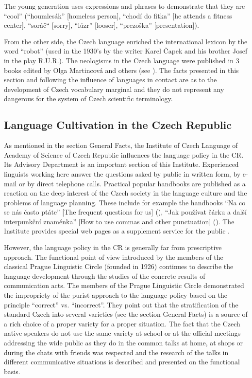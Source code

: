 \begin{multicols}{2}
The young generation uses expressions and phrases to demonstrate that they are “cool” (“houmlesák” {[}homeless person{]}, “chodí do fitka” {[}he attends a fitness center{]}, “soráč“ {[}sorry{]}, “lúzr” {[}looser{]}, “prezoška” {[}presentation{]}).

From the other side, the Czech language enriched the international lexicon by the word “robot” (used in the 1930’s by the writer Karel Čapek and his brother Josef in the play R.U.R.).
The neologisms in the Czech language were published in 3 books edited by Olga Martincová and others (see \cite{Martincova}).
The facts presented in this section and following the influence of languages in contact are as to the development of Czech vocabulary marginal and they do not represent any dangerous for the system of Czech scientific terminology.

\subsection{Language Cultivation in the Czech Republic}

As mentioned in the section General Facts, the Institute of Czech Language of Academy of Science of Czech Republic influences the language policy in the CR. Its Advisory Department is an important section of this Institute. Experienced linguists working here answer the questions asked by public in written form, by e-mail or by direct telephone calls. Practical popular handbooks are published as a reaction on the deep interest of the Czech society in the language culture and the problems of language planning. These include for example the handbooks “Na co se nás často ptáte” {[}The frequent questions for us{]} (\cite{Cerna}), “Jak používat čárku a další interpunkční znaménka” {[}How to use commas and other punctuation{]} (\cite{Janovec}). The Institute provides special web pages as a supplement service for the public \cite{Note6}.

However, the language policy in the CR is generally far from prescriptive approach. The functional point of view introduced by the members of the classical Prague Linguistic Circle (founded in 1926) continues to describe the language development through the studies of the concrete results of communication acts. The members of the Prague Linguistic Circle demonstrated the impropriety of the purist approach to the language policy based on the principle “correct” vs. “incorrect”.  They point out that the stratification of the standard Czech into several varieties (see the section General Facts) is a source of a rich choice of a proper variety for a proper situation. The fact that the Czech native speakers do not use the same variety at school or at the official meetings addressing the wide public as they do in the common talks at home, at shops or during the chats with friends was respected and the research of the talks in different communicative  situations is described and presented on the functional basis.


\end{multicols}

